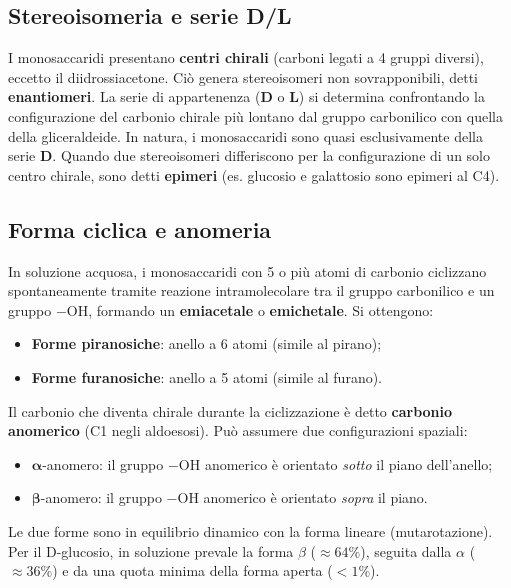 \documentclass[12pt,a4paper]{report}
\begin{document}
\subsection{Stereoisomeria e serie D/L}
I monosaccaridi presentano \textbf{centri chirali} (carboni legati a 4 gruppi diversi), eccetto il diidrossiacetone. Ciò genera stereoisomeri non sovrapponibili, detti \textbf{enantiomeri}. La serie di appartenenza (\textbf{D} o \textbf{L}) si determina confrontando la configurazione del carbonio chirale più lontano dal gruppo carbonilico con quella della gliceraldeide. In natura, i monosaccaridi sono quasi esclusivamente della serie \textbf{D}.
Quando due stereoisomeri differiscono per la configurazione di un solo centro chirale, sono detti \textbf{epimeri} (es. glucosio e galattosio sono epimeri al C4).
\subsection{Forma ciclica e anomeria}
In soluzione acquosa, i monosaccaridi con 5 o più atomi di carbonio ciclizzano spontaneamente tramite reazione intramolecolare tra il gruppo carbonilico e un gruppo \(-\mathrm{OH}\), formando un \textbf{emiacetale} o \textbf{emichetale}. Si ottengono:
\begin{itemize}
\item \textbf{Forme piranosiche}: anello a 6 atomi (simile al pirano);
\item \textbf{Forme furanosiche}: anello a 5 atomi (simile al furano).
\end{itemize}
Il carbonio che diventa chirale durante la ciclizzazione è detto \textbf{carbonio anomerico} (C1 negli aldoesosi). Può assumere due configurazioni spaziali:
\begin{itemize}
\item \(\boldsymbol{\alpha}\)-anomero: il gruppo \(-\mathrm{OH}\) anomerico è orientato \textit{sotto} il piano dell'anello;
\item \(\boldsymbol{\beta}\)-anomero: il gruppo \(-\mathrm{OH}\) anomerico è orientato \textit{sopra} il piano.
\end{itemize}
Le due forme sono in equilibrio dinamico con la forma lineare (mutarotazione). Per il D-glucosio, in soluzione prevale la forma \(\beta\) (\(\approx 64\%\)), seguita dalla \(\alpha\) (\(\approx 36\%\)) e da una quota minima della forma aperta (\(<1\%\)).
\end{document}

